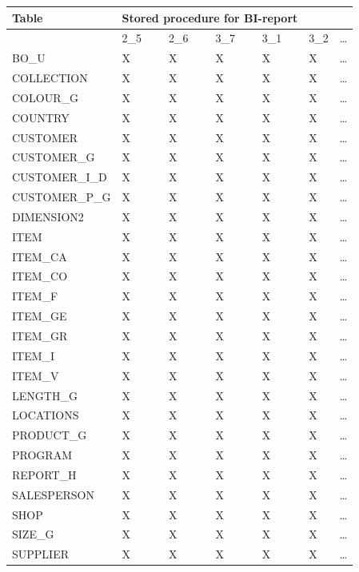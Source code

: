 \documentclass{cslthse-msc}
\begin{document}
\begin{appendices}
\begin{table}[H]
{\begin{tabular}{ l | p{5em} | p{5em}| p{5em}| p{5em}| l l|  }
\LARGE{Table}&\multicolumn{4}{c}{\LARGE{Stored procedure for BI-report}}& \\\hline
	 & 2\_5 & 2\_6 & 3\_7 & 3\_1 & 3\_2 & \dots \\ \hline
	 BO\_U & X & X & X & X & X & \dots \\ \hline
	 COLLECTION & X & X & X & X & X & \dots \\ \hline
	 COLOUR\_G & X & X & X & X & X & \dots \\ \hline
	 COUNTRY & X & X & X & X & X & \dots \\ \hline
	 CUSTOMER & X & X & X & X & X & \dots \\ \hline
	 CUSTOMER\_G & X & X & X & X & X & \dots \\ \hline
	 CUSTOMER\_I\_D & X & X & X & X & X & \dots \\ \hline
	 CUSTOMER\_P\_G & X & X & X & X & X & \dots \\ \hline
	 DIMENSION2 & X & X & X & X & X & \dots \\ \hline
	 ITEM & X & X & X & X & X & \dots \\ \hline
	 ITEM\_CA & X & X & X & X & X & \dots \\ \hline
	 ITEM\_CO & X & X & X & X & X & \dots \\ \hline
	 ITEM\_F & X & X & X & X & X & \dots \\ \hline
	 ITEM\_GE & X & X & X & X & X & \dots \\ \hline
	 ITEM\_GR & X & X & X & X & X & \dots \\ \hline
	 ITEM\_I & X & X & X & X & X & \dots \\ \hline
	 ITEM\_V & X & X & X & X & X & \dots \\ \hline
	 LENGTH\_G & X & X & X & X & X & \dots \\ \hline
	 LOCATIONS & X & X & X & X & X & \dots \\ \hline
	 PRODUCT\_G & X & X & X & X & X & \dots \\ \hline
	 PROGRAM & X & X & X & X & X & \dots \\ \hline
	 REPORT\_H & X & X & X & X & X & \dots \\ \hline
	 SALESPERSON & X & X & X & X & X & \dots \\ \hline
	 SHOP & X & X & X & X & X & \dots \\ \hline
	 SIZE\_G & X & X & X & X & X & \dots \\ \hline
	 SUPPLIER & X & X & X & X & X & \dots \\ \hline

\end{tabular}}
\end{table}
\end{appendices}
\end{document}
